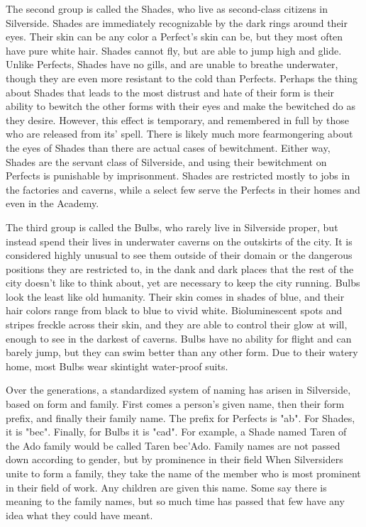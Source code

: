 \documentclass[blue]{Silversiders}
\begin{document}
The second group is called the Shades, who live as second-class citizens in Silverside. Shades are immediately recognizable by the dark rings around their eyes. Their skin can be any color a Perfect's skin can be, but they most often have pure white hair. Shades cannot fly, but are able to jump high and glide. Unlike Perfects, Shades have no gills, and are unable to breathe underwater, though they are even more resistant to the cold than Perfects. Perhaps the thing about Shades that leads to the most distrust and hate of their form is their ability to bewitch the other forms with their eyes and make the bewitched do as they desire. However, this effect is temporary, and remembered in full by those who are released from its' spell. There is likely much more fearmongering about the eyes of Shades than there are actual cases of bewitchment. Either way, Shades are the servant class of Silverside, and using their bewitchment on Perfects is punishable by imprisonment. Shades are restricted mostly to jobs in the factories and caverns, while a select few serve the Perfects in their homes and even in the Academy.

The third group is called the Bulbs, who rarely live in Silverside proper, but instead spend their lives in underwater caverns on the outskirts of the city. It is considered highly unusual to see them outside of their domain or the dangerous positions they are restricted to, in the dank and dark places that the rest of the city doesn't like to think about, yet are necessary to keep the city running. Bulbs look the least like old humanity. Their skin comes in shades of blue, and their hair colors range from black to blue to vivid white. Bioluminescent spots and stripes freckle across their skin, and they are able to control their glow at will, enough to see in the darkest of caverns. Bulbs have no ability for flight and can barely jump, but they can swim better than any other form. Due to their watery home, most Bulbs wear skintight water-proof suits.

Over the generations, a standardized system of naming has arisen in Silverside, based on form and family. First comes a person's given name, then their form prefix, and finally their family name. The prefix for Perfects is "ab". For Shades, it is "bec". Finally, for Bulbs it is "cad". For example, a Shade named Taren of the Ado family would be called Taren bec'Ado. Family names are not passed down according to gender, but by prominence in their field When Silversiders unite to form a family, they take the name of the member who is most prominent in their field of work. Any children are given this name. Some say there is meaning to the family names, but so much time has passed that few have any idea what they could have meant.
\end{document}
